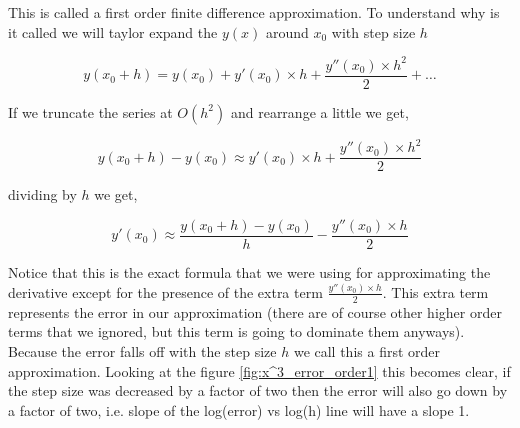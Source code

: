 This is called a  first order finite difference approximation. To understand why is it called we will taylor expand the $y(x)$ around $x_0$ with step size $h$

\begin{equation}
    y(x_0 + h) = y(x_0) + y'(x_0) \times h +\frac{y''(x_0) \times h^2}{2} + \dots
\end{equation}

If we truncate the series at $O(h^2)$ and rearrange a little we get,

\begin{equation}
    y(x_0 + h) - y(x_0) \approx y'(x_0) \times h +\frac{y''(x_0) \times h^2}{2}
\end{equation}

dividing by $h$ we get,

\begin{equation}
    y'(x_0)  \approx \frac{y(x_0 + h) - y(x_0)}{h} - \frac{y''(x_0) \times h}{2}
    \label{eq:1d_1o_error}
\end{equation}

Notice that this is the exact formula that we were using for approximating the derivative except for the presence of the extra term $\frac{y''(x_0) \times h}{2}$. This extra term represents the error in our approximation (there are of course other higher order terms that we ignored, but this term is going to dominate them anyways). Because the error falls off with the step size $h$ we call this a first order approximation. Looking at the figure \ref{fig:x^3_error_order1} this becomes clear, if the step size was decreased by a factor of two then the error will also go down by a factor of two, i.e. slope of the log(error) vs log(h) line will have a slope 1.

